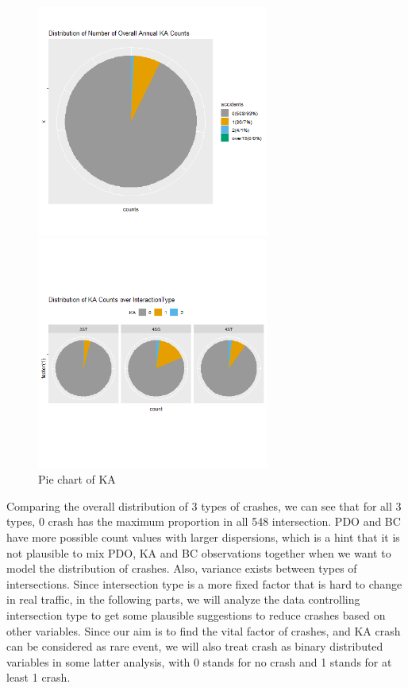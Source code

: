 \documentclass[11pt]{scrartcl} %
\begin{document}
\begin{figure}[H]
\begin{minipage}[t]{0.5\linewidth}
\centering
\includegraphics[width=3in]{image/p112.png}
\small
\end{minipage}
\begin{minipage}[t]{0.5\linewidth}
\centering
\includegraphics[width=3in]{image/p121_KA.png}
\small
\end{minipage}
\caption{Pie chart of KA}
\end{figure}

Comparing the overall distribution of 3 types of crashes, we can see that for all 3 types, 0 crash has the maximum proportion in all 548 intersection. PDO and BC have more possible count values with larger dispersions, which is a hint that it is not plausible to mix PDO, KA and BC observations together when we want to model the distribution of crashes. Also, variance exists between types of intersections. Since intersection type is a more fixed factor that is hard to change in real traffic, in the following parts, we will analyze the data controlling intersection type to get some plausible suggestions to reduce crashes based on other variables. Since our aim is to find the vital factor of crashes, and KA crash can be considered as rare event, we will also treat crash as binary distributed variables in some latter analysis, with 0 stands for no crash and 1 stands for at least 1 crash.
\end{document}
